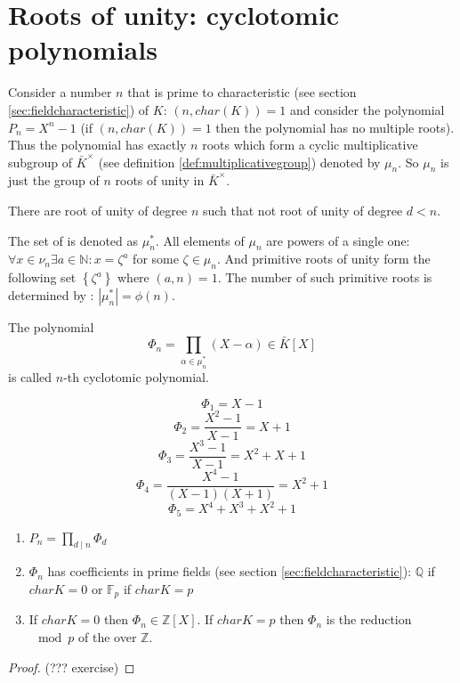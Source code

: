 \section{ Roots of unity: cyclotomic polynomials}
Consider a number $n$ that is prime to characteristic (see section
\ref{sec:fieldcharacteristic}) of $K$:
$\left(n, char\left(K\right)\right) = 1$ and consider the polynomial
$P_n = X^n - 1$ (if $\left(n, char\left(K\right)\right) = 1$ then the
polynomial has no multiple roots). Thus the polynomial has exactly $n$
roots which form a cyclic multiplicative subgroup of $\bar{K}^\times$
(see definition \ref{def:multiplicativegroup})
denoted by $\mu_n$. So $\mu_n$ is just the group of $n$ roots of unity
in $\bar{K}^\times$.

\begin{definition}
  There are root of unity of degree $n$ such that not root of unity of
  degree $d < n$.
  \label{def:primitiverootsofunity}
\end{definition}

The set of  is denoted as
$\mu_n^*$. All elements of $\mu_n$ are powers of a single one:
$\forall x \in \nu_n \exists a \in \mathbb{N}: x = \zeta^a$ for some
$\zeta \in \mu_n$. And primitive roots of unity form the following set
$\left\{\zeta^a\right\}$ where $\left(a, n\right) = 1$. The number of
such primitive roots is determined by :
$\left|\mu_n^*\right| = \phi\left(n\right)$.

\begin{definition}
  The polynomial
  \[
  \Phi_n = \prod_{\alpha \in \mu_n^*}\left(X - \alpha\right) \in \bar{K}\left[X\right]
  \]
  is called $n$-th cyclotomic polynomial.
  \label{def:cyclotomicpolynomial}
\end{definition}

\begin{example}
  \[
  \Phi_1 = X - 1
  \]
  \[
  \Phi_2 = \frac{X^2 - 1}{X-1} = X + 1
  \]
  \[
  \Phi_3 = \frac{X^3 - 1}{X-1} = X^2 + X + 1
  \]
  \[
  \Phi_4 = \frac{X^4 - 1}{\left(X-1\right)\left(X + 1\right)} = X^2 + 1
  \]
  \[
  \Phi_5 = X^4 + X^3 + X^2 + 1
  \]  
\end{example}

\begin{proposition}
  \begin{enumerate}
    \item 
      \(
      P_n = \prod_{d \mid n} \Phi_d
      \)
    \item $\Phi_n$ has coefficients in prime fields (see section
      \ref{sec:fieldcharacteristic}): $\mathbb{Q}$ if $char K = 0$ or
      $\mathbb{F}_p$ if $char K = p$
    \item If $char K = 0$ then $\Phi_n \in
      \mathbb{Z}\left[X\right]$. If $char K = p$ then $\Phi_n$ is the
      reduction $\mod{p}$ of the 
      over $\mathbb{Z}$.
  \end{enumerate}
  \begin{proof}
    (??? exercise)
  \end{proof}
\end{proposition}

